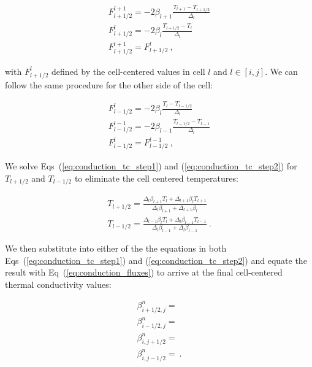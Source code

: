 \documentclass[letterpaper,12pt]{article}
\begin{document}
\begin{equation}
  \begin{aligned}
    F^{l+1}_{l+1/2} = -2 \beta_{l+1}
    \frac{T_{l+1}-T_{l+1/2}}{\Delta_l} \\ F^{l}_{l+1/2} = -2 \beta_{l}
    \frac{T_{l+1/2}-T_l}{\Delta_l} \\
    F^{l+1}_{l+1/2} = F^{l}_{l+1/2} \:,
    \label{eq:conduction_tc_step1}
  \end{aligned}
\end{equation}

with $F^{l}_{l+1/2}$ defined by the cell-centered values in cell $l$
and $l \in [i,j]$. We can follow the same procedure for the other side
of the cell:

\begin{equation}
  \begin{aligned}
    F^{l}_{l-1/2} = -2 \beta_{l} \frac{T_{l}-T_{l-1/2}}{\Delta_l}
    \\ F^{l-1}_{l-1/2} = -2 \beta_{l-1}
    \frac{T_{l-1/2}-T_{l-1}}{\Delta_l} \\ F^{l}_{l-1/2} =
    F^{l-1}_{l-1/2} \:,
    \label{eq:conduction_tc_step2}
  \end{aligned}
\end{equation}

We solve Eqs~(\ref{eq:conduction_tc_step1}) and
(\ref{eq:conduction_tc_step2}) for $T_{l+1/2}$ and $T_{l-1/2}$ to
eliminate the cell centered temperatures:

\begin{equation}
  \begin{aligned}
    T_{l+1/2} = \frac{\Delta_l \beta_{l+1} T_{l} + \Delta_{l+1}
      \beta_{l} T_{l+1}} {\Delta_l \beta_{l+1} + \Delta_{l+1} \beta_{l}}
    \\ T_{l-1/2} = \frac{\Delta_{l-1} \beta_{l} T_{l} + \Delta_{l}
      \beta_{l-1} T_{l-1}} {\Delta_{l} \beta_{l-1} + \Delta_{l}
      \beta_{l-1}} \:.
    \label{eq:conduction_tc_step3}
  \end{aligned}
\end{equation}

We then substitute into either of the the equations in both
Eqs~(\ref{eq:conduction_tc_step1}) and (\ref{eq:conduction_tc_step2})
and equate the result with Eq~(\ref{eq:conduction_fluxes}) to arrive
at the final cell-centered thermal conductivity values:

\begin{equation}
  \begin{aligned}
    \beta^n_{i+1/2,j} = \\
    \beta^n_{i-1/2,j} = \\
    \beta^n_{i,j+1/2} = \\
    \beta^n_{i,j-1/2} = \:.
    \label{eq:conduction_tc_step_4}
  \end{aligned}
\end{equation}
\end{document}
